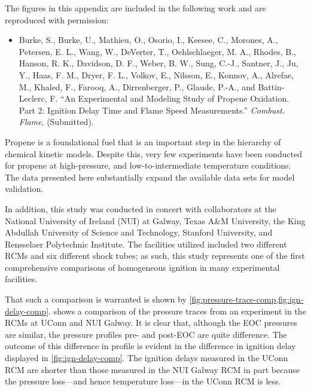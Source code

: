 \documentclass[../main.tex]{subfiles}
\begin{document}
The figures in this appendix are included in the following work and are reproduced with permission:

\begin{itemize}
\item[] Burke, S., Burke, U., Mathieu, O., Osorio, I., Keesee, C.,
Morones, A., Petersen, E. L., Wang, W., DeVerter, T.,
Oehlschlaeger, M. A., Rhodes, B., Hanson, R. K., Davidson, D. F.,
Weber, B. W., Sung, C.-J., Santner, J., Ju, Y., Haas, F. M.,
Dryer, F. L., Volkov, E., Nilsson, E., Konnov, A., Alrefae, M.,
Khaled, F., Farooq, A., Dirrenberger, P., Glaude, P.-A., and
Battin-Leclerc, F. ``An Experimental and Modeling Study of
Propene Oxidation. Part 2: Ignition Delay Time and Flame Speed
Measurements.'' \textit{Combust. Flame}, (Submitted).
\end{itemize}

Propene is a foundational fuel that is an important step in the hierarchy
of chemical kinetic models. Despite this, very few experiments have
been conducted for propene at high-pressure, and low-to-intermediate
temperature conditions. The data presented here substantially expand
the available data sets for model validation.

In addition, this study was conducted in concert with collaborators at
the National University of Ireland (NUI) at Galway, Texas A\&M
University, the King Abdullah University of Science and Technology,
Stanford University, and Rensselaer Polytechnic Institute. The facilities
utilized included two different RCMs and six different shock tubes; as such,
this study represents one of the first comprehensive comparisons of
homogeneous ignition in many experimental facilities.

That such a comparison is warranted is shown by
\cref{fig:pressure-trace-comp,fig:ign-delay-comp}. 
shows a comparison of the pressure traces from an experiment in the RCMs
at UConn and NUI Galway. It is clear that, although the EOC pressures are
similar, the pressure profiles pre- and post-EOC are quite difference. The
outcome of this difference in profile is evident in the difference in ignition
delay displayed in \cref{fig:ign-delay-comp}. The ignition delays measured
in the UConn RCM are shorter than those measured in the NUI Galway RCM
in part because the pressure loss---and hence temperature loss---in the
UConn RCM is less.
\end{document}
